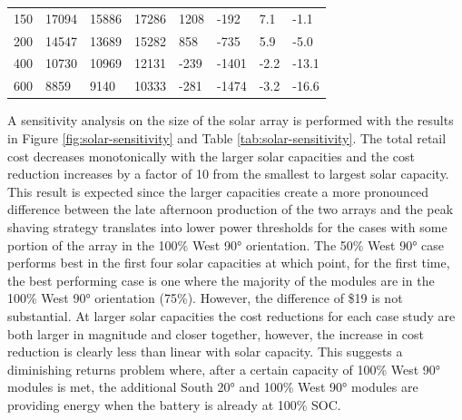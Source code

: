 \documentclass[journal,article,submit,pdftex,moreauthors]{Definitions/mdpi}
\begin{document}
\begin{table}[!h]
\begin{tabularx}{\textwidth}{XXXXXXXX}
    150             & 17094                           & 15886                                     & 17286                                     & 1208          & -192           & 7.1           & -1.1           \\
    200             & 14547                           & 13689                                     & 15282                                     & 858           & -735           & 5.9           & -5.0           \\
    400             & 10730                           & 10969                                     & 12131                                     & -239          & -1401          & -2.2          & -13.1          \\
    600             & 8859                            & 9140                                      & 10333                                     & -281          & -1474          & -3.2          & -16.6          \\
    \bottomrule
  \end{tabularx}
\end{table}

A sensitivity analysis on the size of the solar array is performed with the results in Figure \ref{fig:solar-sensitivity} and Table \ref{tab:solar-sensitivity}. The total retail cost decreases monotonically with the larger solar capacities and the cost reduction increases by a factor of 10 from the smallest to largest solar capacity. This result is expected since the larger capacities create a more pronounced difference between the late afternoon production of the two arrays and the peak shaving strategy translates into lower power thresholds for the cases with some portion of the array in the 100\% West 90° orientation. The 50\% West 90° case performs best in the first four solar capacities at which point, for the first time, the best performing case is one where the majority of the modules are in the 100\% West 90° orientation (75\%). However, the difference of \$19 is not substantial. At larger solar capacities the cost reductions for each case study are both larger in magnitude and closer together, however, the increase in cost reduction is clearly less than linear with solar capacity. This suggests a diminishing returns problem where, after a certain capacity of 100\% West 90° modules is met, the additional South 20° and 100\% West 90° modules are providing energy when the battery is already at 100\% SOC.
\end{document}
